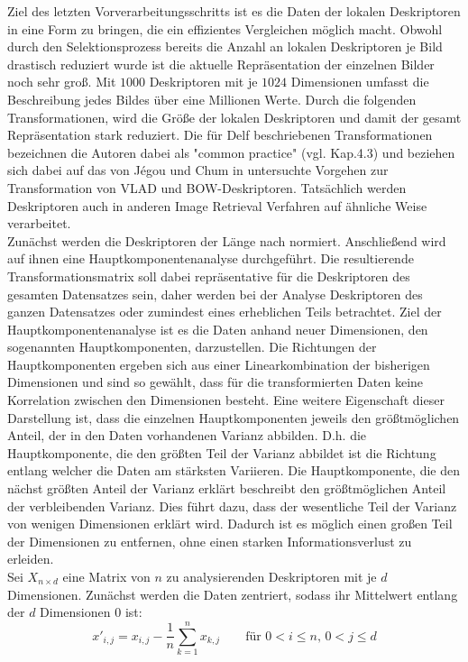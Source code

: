 Ziel des letzten Vorverarbeitungsschritts ist es die Daten der lokalen Deskriptoren in eine Form zu bringen, die ein effizientes Vergleichen möglich macht. Obwohl durch den Selektionsprozess bereits die Anzahl an lokalen Deskriptoren je Bild drastisch reduziert wurde ist die aktuelle Repräsentation der einzelnen Bilder noch sehr groß. Mit $1000$ Deskriptoren mit je $1024$ Dimensionen umfasst die Beschreibung jedes Bildes über eine Millionen Werte. Durch die folgenden Transformationen, wird die Größe der lokalen Deskriptoren und damit der gesamt Repräsentation stark reduziert. Die für Delf beschriebenen Transformationen bezeichnen die Autoren dabei als "common practice" (vgl. \cite{delf} Kap.4.3) und beziehen sich dabei auf das von Jégou und Chum in \cite{common_practice} untersuchte Vorgehen zur Transformation von VLAD und BOW-Deskriptoren. Tatsächlich werden Deskriptoren auch in anderen Image Retrieval Verfahren \cite{convnet} \cite{one} auf ähnliche Weise verarbeitet.
\\
Zunächst werden die Deskriptoren der Länge nach normiert. Anschließend wird auf ihnen eine Hauptkomponentenanalyse durchgeführt. Die resultierende Transformationsmatrix soll dabei repräsentative für die Deskriptoren des gesamten Datensatzes sein, daher werden bei der Analyse Deskriptoren des ganzen Datensatzes oder zumindest eines erheblichen Teils betrachtet. Ziel der Hauptkomponentenanalyse ist es die Daten anhand neuer Dimensionen, den sogenannten Hauptkomponenten, darzustellen. Die Richtungen der Hauptkomponenten ergeben sich aus einer Linearkombination der bisherigen Dimensionen und sind so gewählt, dass für die transformierten Daten keine Korrelation zwischen den Dimensionen besteht. Eine weitere Eigenschaft dieser Darstellung ist, dass die einzelnen Hauptkomponenten jeweils den größtmöglichen Anteil, der in den Daten vorhandenen Varianz abbilden. D.h. die Hauptkomponente, die den größten Teil der Varianz abbildet ist die Richtung entlang welcher die Daten am stärksten Variieren. Die Hauptkomponente, die den nächst größten Anteil der Varianz erklärt beschreibt den größtmöglichen Anteil der verbleibenden Varianz. Dies führt dazu, dass der wesentliche Teil der Varianz von wenigen Dimensionen erklärt wird. Dadurch ist es möglich einen großen Teil der Dimensionen zu entfernen, ohne einen starken Informationsverlust zu erleiden.
\\
Sei $X_{n\times d}$ eine Matrix von $n$ zu analysierenden Deskriptoren mit je $d$ Dimensionen. 
Zunächst werden die Daten zentriert, sodass ihr Mittelwert entlang der $d$ Dimensionen $0$ ist:
\begin{equation}
x'_{i,j} = x_{i,j}-\frac{1}{n}\sum_{k=1}^n{x_{k,j}}\qquad \text{für }0<i\leq n\text{, }0<j\leq d
\end{equation}

